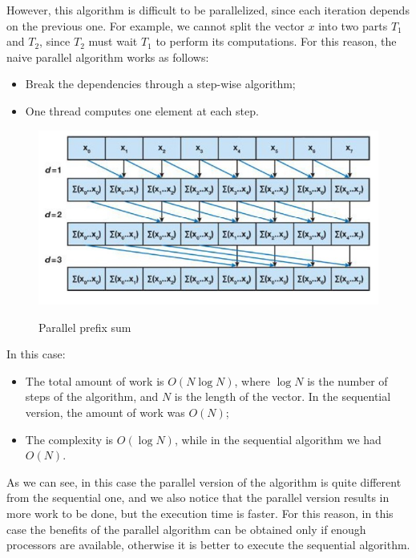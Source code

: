 However, this algorithm is difficult to be parallelized, since each iteration depends on the previous one. For example, we cannot split the vector $x$ into two parts $T_1$ and $T_2$, since $T_2$ must wait $T_1$ to perform its computations. For this reason, the naive parallel algorithm works as follows:

\begin{itemize}
    \item Break the dependencies through a step-wise algorithm;
    \item One thread computes one element at each step.
\end{itemize}

\begin{figure}[h!]
		\centering
		\includegraphics[scale = 1.6]{img/parallel prefix sum .jpg}
        \label{parallel prefix sum}
        \caption{Parallel prefix sum}
\end{figure}

In this case:

\begin{itemize}
    \item The total amount of work is $O(N \log N)$, where $\log N$ is the number of steps of the algorithm, and $N$ is the length of the vector. In the sequential version, the amount of work was $O(N)$;
    \item The complexity is $O(\log N)$, while in the sequential algorithm we had $O(N)$.
\end{itemize}

As we can see, in this case the parallel version of the algorithm is quite different from the sequential one, and we also notice that the parallel version results in more work to be done, but the execution time is faster. For this reason, in this case the benefits of the parallel algorithm can be obtained only if enough processors are available, otherwise it is better to execute the sequential algorithm.

